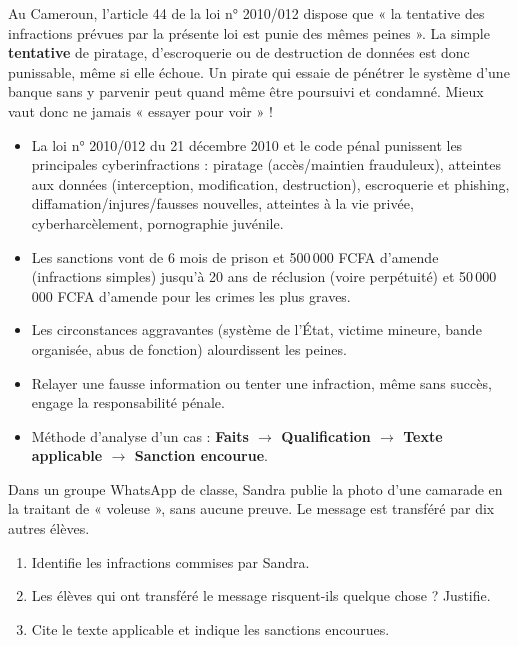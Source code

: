 \documentclass[11pt]{article}
\begin{document}
\begin{savaistu}
Au Cameroun, l'article 44 de la loi n° 2010/012 dispose que « la tentative des infractions prévues par la présente loi est punie des mêmes peines ». La simple \textbf{tentative} de piratage, d'escroquerie ou de destruction de données est donc punissable, même si elle échoue. Un pirate qui essaie de pénétrer le système d'une banque sans y parvenir peut quand même être poursuivi et condamné. Mieux vaut donc ne jamais « essayer pour voir » !
\end{savaistu}

\begin{aretenir}
\begin{itemize}
  \item La loi n° 2010/012 du 21 décembre 2010 et le code pénal punissent les principales cyberinfractions : piratage (accès/maintien frauduleux), atteintes aux données (interception, modification, destruction), escroquerie et phishing, diffamation/injures/fausses nouvelles, atteintes à la vie privée, cyberharcèlement, pornographie juvénile.
  \item Les sanctions vont de 6 mois de prison et 500\,000 FCFA d'amende (infractions simples) jusqu'à 20 ans de réclusion (voire perpétuité) et 50\,000\,000 FCFA d'amende pour les crimes les plus graves.
  \item Les circonstances aggravantes (système de l'État, victime mineure, bande organisée, abus de fonction) alourdissent les peines.
  \item Relayer une fausse information ou tenter une infraction, même sans succès, engage la responsabilité pénale.
  \item Méthode d'analyse d'un cas : \textbf{Faits $\rightarrow$ Qualification $\rightarrow$ Texte applicable $\rightarrow$ Sanction encourue}.
\end{itemize}
\end{aretenir}

\begin{exercice}
Dans un groupe WhatsApp de classe, Sandra publie la photo d'une camarade en la traitant de « voleuse », sans aucune preuve. Le message est transféré par dix autres élèves.
\begin{enumerate}
  \item Identifie les infractions commises par Sandra.
  \item Les élèves qui ont transféré le message risquent-ils quelque chose ? Justifie.
  \item Cite le texte applicable et indique les sanctions encourues.
\end{enumerate}
\end{exercice}
\end{document}
